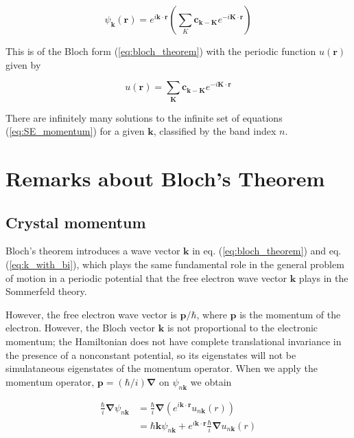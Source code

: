 	\begin{equation} \label{eq:psi_proof}
		\psi_{\mathbf{k}}(\mathbf{r})
		= e^{i\mathbf{k} \cdot \mathbf{r}}
		\left(\sum_{K} \boldsymbol{c}_{\mathbf{k-K}}
		e^{-i\mathbf{K\cdot r}}
		\right)
	\end{equation}

	This is of the Bloch form (\ref{eq:bloch_theorem}) with the periodic function $u(\mathbf{r})$ given by

	\begin{equation} \label{eq:u_r}
		u(\mathbf{r}) = 
		\sum_{\mathbf{K}} 
		\boldsymbol{c}_{\mathbf{k-K}}
		e^{-i\mathbf{K \cdot r}}
	\end{equation}

	There are infinitely many solutions to the infinite set of equations (\ref{eq:SE_momentum}) for a given $\mathbf{k}$, classified by the band index $n$.

\section{Remarks about Bloch's Theorem}
	\subsection{Crystal momentum}
		Bloch's theorem introduces a wave vector $\mathbf{k}$ in eq. (\ref{eq:bloch_theorem}) and eq. (\ref{eq:k_with_bi}), which plays the same fundamental role in the general problem of motion in a periodic potential that the free electron wave vector $\mathbf{k}$ plays in the Sommerfeld theory. 

		However, the free electron wave vector is $\mathbf{p}/\hbar$, where $\mathbf{p}$ is the momentum of the electron. However, the Bloch vector $\mathbf{k}$ is not proportional to the electronic momentum; the Hamiltonian does not have complete translational invariance in the presence of a nonconstant potential, so its eigenstates will not be simulataneous eigenstates of the momentum operator.  When we apply the momentum operator, $\mathbf{p}=(\hbar/i)\boldsymbol{\nabla}$ on $\psi_{n\mathbf{k}}$ we obtain

		\begin{align} \label{momentum}
			\frac{\hbar}{i}\boldsymbol{\nabla}
			\psi_{n\mathbf{k}}
			&= \frac{\hbar}{i}\boldsymbol{\nabla}
			\left(
			e^{i\mathbf{k \cdot r}}
			u_{n\mathbf{k}}(r)
			\right) \\
			&= \hbar \mathbf{k} \psi_{n\mathbf{k}}
			+ e^{i\mathbf{k \cdot r}}
			\frac{\hbar}{i} \boldsymbol{\nabla}
			u_{n\mathbf{k}} (r)
		\end{align}

